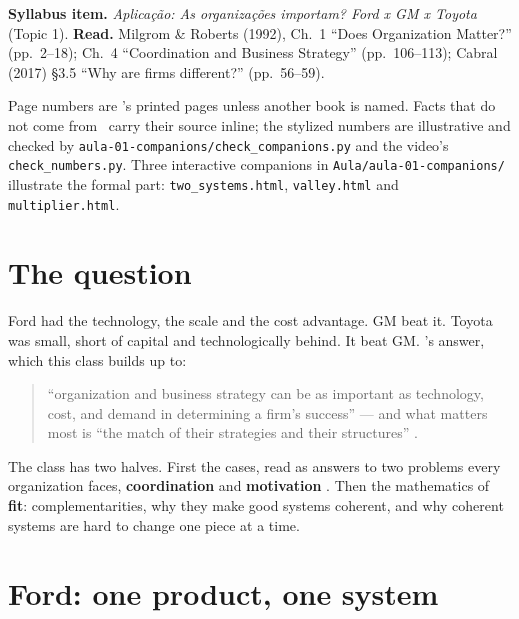 
\textbf{Syllabus item.} \emph{Aplicação: As organizações importam? Ford x GM x Toyota} (Topic 1).
\textbf{Read.} Milgrom \& Roberts (1992), Ch.~1 ``Does Organization Matter?'' (pp.~2--18);
Ch.~4 ``Coordination and Business Strategy'' (pp.~106--113); Cabral (2017) \S3.5 ``Why are firms
different?'' (pp.~56--59).

Page numbers are \MR's printed pages unless another book is named. Facts that do not come from
\MR\ carry their source inline; the stylized numbers are illustrative and checked by
\texttt{aula-01-companions/check\_companions.py} and the video's \texttt{check\_numbers.py}.
Three interactive companions in \texttt{Aula/aula-01-companions/} illustrate the formal part:
\texttt{two\_systems.html}, \texttt{valley.html} and \texttt{multiplier.html}.

\section{The question}\label{sec:a1-question}

Ford had the technology, the scale and the cost advantage. GM beat it. Toyota was small, short of
capital and technologically behind. It beat GM. \MR's answer, which this class builds up to:

\begin{quote}
``organization and business strategy can be as important as technology, cost, and demand in
determining a firm's success''  --- and what matters most is ``the match of their
strategies and their structures'' .
\end{quote}

The class has two halves. First the cases, read as answers to two problems every organization
faces, \textbf{coordination} and \textbf{motivation} . Then the mathematics of
\textbf{fit}: complementarities, why they make good systems coherent, and why coherent systems are
hard to change one piece at a time.

\section{Ford: one product, one system}\label{sec:a1-ford}

